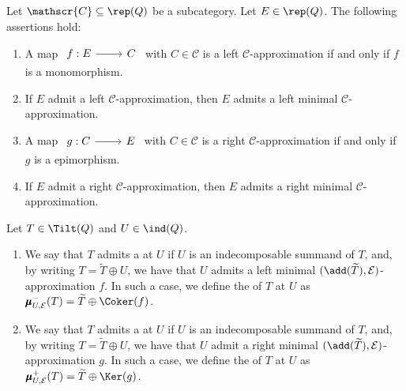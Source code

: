 \begin{prop} \label{prop:Approxismonoepi}
    Let $\mathscr{C} \subseteq \rep(Q)$ be a subcategory. Let $E \in \rep(Q)$. The following assertions hold:
    \begin{enumerate}[label=$(\roman*)$, itemsep=1mm]
        \item A map $\begin{tikzcd}
	f: E & C
	\arrow[from=1-1, to=1-2]
        \end{tikzcd}$ with $C \in \mathscr{C}$ is a left $\mathscr{C}$-approximation if and only if $f$ is a monomorphism.
        \item If $E$ admit a left $\mathscr{C}$-approximation, then $E$ admits a left minimal $\mathscr{C}$-approximation.
        \item A map $\begin{tikzcd}
	g: C & E
	\arrow[from=1-1, to=1-2]
        \end{tikzcd}$ with $C \in \mathscr{C}$ is a right $\mathscr{C}$-approximation if and only if $g$ is a epimorphism.
        \item If $E$ admit a right $\mathscr{C}$-approximation, then $E$ admits a right minimal $\mathscr{C}$-approximation.
    \end{enumerate}
\end{prop}


\begin{definition} \label{def:leftrightEmutation}
Let $T \in \Tilt(Q)$ and $U \in \ind(Q)$.
\begin{enumerate}[label=$\bullet$, itemsep=1mm]
    \item We say that $T$ admits a  at $U$ if $U$ is an indecomposable summand of $T$, and, by writing $T = \widetilde{T} \oplus U$, we have that $U$ admits a left minimal $(\add(\widetilde{T}),\mathcal{E})$-approximation $f$. In such a case, we define the  of $T$ at $U$ as $\pmb{\mu}_{U,\mathcal{E}}^{-}(T) = \widetilde{T} \oplus \Coker(f)$. 
    \item We say that $T$ admits a  at $U$ if $U$ is an indecomposable summand of $T$, and, by writing $T = \widetilde{T} \oplus U$, we have that $U$ admit a right minimal $(\add(\widetilde{T}),\mathcal{E})$-approximation $g$. In such a case, we define the  of $T$ at $U$ as $\pmb{\mu}_{U,\mathcal{E}}^{+}(T) = \widetilde{T} \oplus \Ker(g)$. 
\end{enumerate}
\end{definition}

